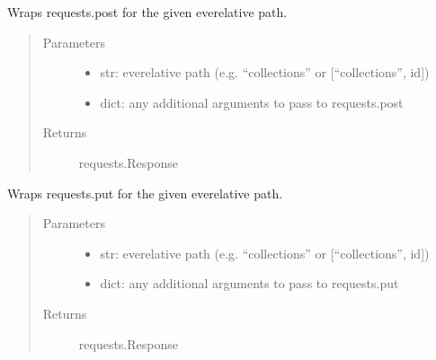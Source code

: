 \documentclass[letterpaper,10pt,english]{sphinxmanual}
\begin{document}
\begin{fulllineitems}
\label{\detokenize{autoapi/pine/backend/data/service/index:pine.backend.data.service.post}}
Wraps requests.post for the given eve\sphinxhyphen{}relative path.
\begin{quote}\begin{description}
\item[{Parameters}] \leavevmode\begin{itemize}
\item {} 
 \textendash{} str: eve\sphinxhyphen{}relative path (e.g. “collections” or {[}“collections”, id{]})

\item {} 
 \textendash{} 
dict: any additional arguments to pass to requests.post


\end{itemize}

\item[{Returns}] \leavevmode
requests.Response

\end{description}\end{quote}

\end{fulllineitems}


\begin{fulllineitems}
\label{\detokenize{autoapi/pine/backend/data/service/index:pine.backend.data.service.put}}
Wraps requests.put for the given eve\sphinxhyphen{}relative path.
\begin{quote}\begin{description}
\item[{Parameters}] \leavevmode\begin{itemize}
\item {} 
 \textendash{} str: eve\sphinxhyphen{}relative path (e.g. “collections” or {[}“collections”, id{]})

\item {} 
 \textendash{} 
dict: any additional arguments to pass to requests.put


\end{itemize}

\item[{Returns}] \leavevmode
requests.Response

\end{description}\end{quote}

\end{fulllineitems}
\end{document}
